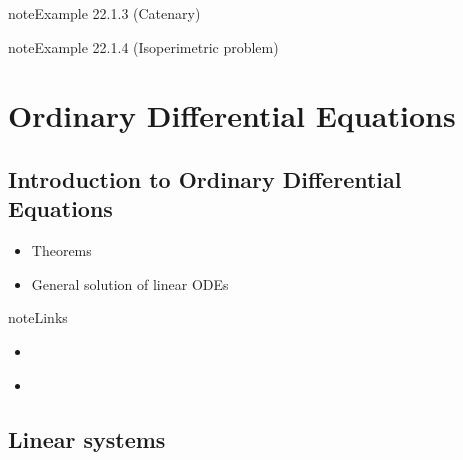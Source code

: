 \documentclass[letterpaper,10pt,english]{jupyterBook}
\begin{document}
\label{ch/calculus-variations/intro:example-2}
\begin{sphinxadmonition}{note}{Example 22.1.3 (Catenary)}


\end{sphinxadmonition}
\label{ch/calculus-variations/intro:example-3}
\begin{sphinxadmonition}{note}{Example 22.1.4 (Isoperimetric problem)}


\end{sphinxadmonition}

\sphinxstepscope


\part{Ordinary Differential Equations}

\sphinxstepscope


\chapter{Introduction to Ordinary Differential Equations}
\label{\detokenize{ch/ode/intro:introduction-to-ordinary-differential-equations}}\label{\detokenize{ch/ode/intro:ode-intro}}\label{\detokenize{ch/ode/intro::doc}}\begin{itemize}
\item {} 
\sphinxAtStartPar
Theorems

\item {} 
\sphinxAtStartPar
General solution of linear ODEs

\end{itemize}

\begin{sphinxadmonition}{note}{Links}
\begin{itemize}
\item {} 
\sphinxAtStartPar
{\hyperref[\detokenize{ch/system-theory/intro:system-theory-intro}]{}}

\item {} 
\sphinxAtStartPar
{\hyperref[\detokenize{ch/control/intro:control-intro}]{}}

\end{itemize}
\end{sphinxadmonition}

\sphinxstepscope


\chapter{Linear systems}
\label{\detokenize{ch/ode/ode-linear-systems:linear-systems}}\label{\detokenize{ch/ode/ode-linear-systems:ode-linear-miscellanea}}\label{\detokenize{ch/ode/ode-linear-systems::doc}}
\end{document}
